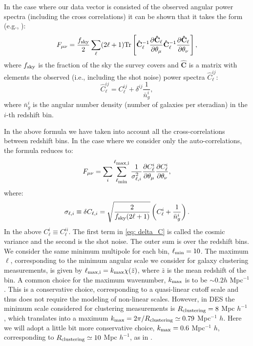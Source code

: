 \documentclass[a4paper,fleqn,usenatbib]{mnras}
\begin{document}
In the case where our data vector is consisted of the observed angular power spectra (including the cross correlations) it can be shown that it takes the form (e.g., \citealt{Hu2004, Passaglia2017}):
\begin{equation}
F_{\mu \nu} = \frac{f_{\mbox{\scriptsize{sky}}}}{2} \sum_{\ell} (2\ell + 1)\mbox{Tr}\left[\mathbf{\hat{C}}_\ell^{-1} \frac{\partial \mathbf{\hat{C}}_{\ell}}{\partial \theta_\mu} \mathbf{\hat{C}}_\ell^{-1} \frac{\partial \mathbf{\hat{C}}_{\ell}}{\partial \theta_\nu} \right],
\end{equation}
where $f_{\mbox{\scriptsize{sky}}}$ is the fraction of the sky the survey covers and  $\mathbf{\hat{C}}$ is a matrix with elements the observed (i.e., including the shot noise) power spectra $\hat{C}_\ell^{ij}$:
\begin{equation}
\hat{C}_\ell^{ij} = C_\ell^{ij} + \delta^{ij}\frac{1}{\bar{n}_g^i},
\end{equation}
where $\bar{n}_g^i$ is the angular number density (number of galaxies per steradian) in the $i$-th redshift bin.

In the above formula we have taken into account all the cross-correlations between redshift bins. In the case where we consider only the auto-correlations, the formula reduces to:
\begin{equation}
F_{\mu \nu} = \sum_i \sum_{\ell_{\mbox{\scriptsize{{min}}}}}^{\ell_{\mbox{\scriptsize{{max,i}}}}} \frac{1}{\sigma^2_{\ell,i}}\frac{\partial C_\ell^{i}}{\partial \theta_\mu} \frac{\partial C_\ell^{i}}{\partial \theta_\nu},
\end{equation}
where:
\begin{equation}
\label{eq: delta_C}
\sigma_{\ell,i} \equiv 
\delta C_{\ell,i} = \sqrt{\frac{2}{f_{\mbox{\scriptsize{sky}}}(2\ell + 1)}}\left(C_\ell^{i} + \frac{1}{\bar{n}_g^i} \right).
\end{equation}
In the above $C_\ell^i \equiv C_\ell^{ii}$.  The first term in \eqref{eq: delta_C} is called the cosmic variance and the second is the shot noise. The outer sum is over the redshift bins. We consider the same minimum multipole for each bin, $\ell_{\mbox{\scriptsize{min}}} = 10$. The maximum $\ell$, corresponding to the minimum angular scale we consider for galaxy clustering measurements, is given by $\ell_{\mbox{\scriptsize{max,i}}} = k_{\mbox{\scriptsize{max}}}\chi(\bar{z})$, where $\bar{z}$ is the mean redshift of the bin. A common choice for the maximum  wavenumber, $k_{\mbox{\scriptsize{max}}}$ is to be $\sim 0.2 h$ Mpc$^{-1}$. This is a conservative choice, corresponding to a quasi-linear cutoff scale and thus does not require the modeling of non-linear scales. However, in DES the minimum scale considered for clustering measurements is $R_{\mbox{\scriptsize{clustering}}} = 8$ Mpc $h^{-1}$ \citep{Krause2017}, which translates into a maximum $k_{\mbox{\scriptsize{max}}} = 2\pi/R_{\mbox{\scriptsize{clustering}}} \simeq 0.79 $ Mpc$^{-1}$ $h$. Here we will adopt a little bit more conservative choice,  $k_{\mbox{\scriptsize{max}}} = 0.6$ Mpc$^{-1}$ $h$, corresponding to $R_{\mbox{\scriptsize{clustering}}} \simeq 10$ Mpc $h^{-1}$, as in \citealt{Krause2017a}. 
\end{document}
